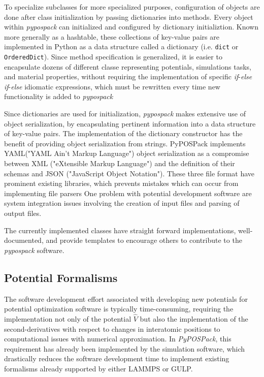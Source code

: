 To specialize subclasses for more specialized purposes, configuration of objects are done after class initialization by passing dictionaries into methods.  Every object within \emph{pypospack} can initialized and configured by dictionary initializtion.  Known more generally as a hashtable, these collections of key-value pairs are implemented in Python as a data structure called a dictionary (i.e. \verb|dict| or \verb|OrderedDict|).
  Since method specification is generalized, it is easier to encapsulate dozens of different classe representing potentials, simulations tasks, and material properties, without requiring the implementation of specific \emph{if}-\emph{else if}-\emph{else} idiomatic expressions, which must be rewritten every time new functionality is added to \emph{pypospack}

Since dictionaries are used for initialization, \emph{pypospack} makes extensive use of object serialization, by encapsulating pertinent information into a data structure of key-value pairs.
The implementation of the dictionary constructor has the benefit of providing object serialization from strings.  PyPOSPack implements YAML("YAML Ain't Markup Language")\cite{yaml_version_1_2r} object serialization as a compromise between XML ("eXtensible Markup Language") and the definition of their schemas and JSON ("JavaScript Object Notation").  These three file format have prominent existing libraries, which prevents mistakes which can occur from implementing file parsers
One problem with potential development software are system integration issues involving the creation of input files and parsing of output files.

The currently implemented classes have straight forward implementations, well-documented, and provide templates to encourage others to contribute to the \emph{pypospack} software.

\subsection{Potential Formalisms}

The software development effort associated with developing new potentials for potential optimization software is typically time-consuming, requiring the implementation not only of the potential $\hat{V}$ but also the implementation of the second-derivatives with respect to changes in interatomic positions to computational issues with numerical approximation.  In \emph{PyPOSPack}, this requirement has already been implemented by the simulation software, which drastically reduces the software development time to implement existing formalisms already supported by either LAMMPS or GULP.

